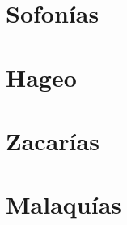 \chapter{Sofonías}
\begin{multicols}{2}
  \parskip=0pt \relax
  
\end{multicols}

\chapter{Hageo}
\begin{multicols}{2}
  \parskip=0pt \relax
  
\end{multicols}

\chapter{Zacarías}
\begin{multicols}{2}
  \parskip=0pt \relax
  
\end{multicols}

\chapter{Malaquías}
\begin{multicols}{2}
  \parskip=0pt \relax
  
\end{multicols}

\newpage

\pagestyle{empty}

